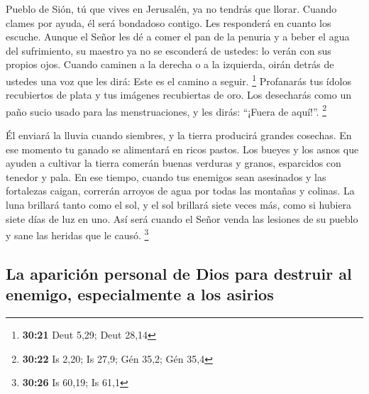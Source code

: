  Pueblo de Sión, tú que vives en Jerusalén, ya no tendrás
que llorar. Cuando clames por ayuda, él será bondadoso contigo. Les
responderá en cuanto los escuche.  Aunque el Señor les dé
a comer el pan de la penuria y a beber el agua del sufrimiento, su
maestro ya no se esconderá de ustedes: lo verán con sus propios ojos.
 Cuando caminen a la derecha o a la izquierda, oirán
detrás de ustedes una voz que les dirá: Este es el camino a seguir.
\footnote{\textbf{30:21} Deut 5,29; Deut 28,14} 
Profanarás tus ídolos recubiertos de plata y tus imágenes recubiertas de
oro. Los desecharás como un paño sucio usado para las menstruaciones, y
les dirás: ``¡Fuera de aquí!''. \footnote{\textbf{30:22} Is 2,20; Is
  27,9; Gén 35,2; Gén 35,4}

 Él enviará la lluvia cuando siembres, y la tierra
producirá grandes cosechas. En ese momento tu ganado se alimentará en
ricos pastos.  Los bueyes y los asnos que ayuden a
cultivar la tierra comerán buenas verduras y granos, esparcidos con
tenedor y pala.  En ese tiempo, cuando tus enemigos sean
asesinados y las fortalezas caigan, correrán arroyos de agua por todas
las montañas y colinas.  La luna brillará tanto como el
sol, y el sol brillará siete veces más, como si hubiera siete días de
luz en uno. Así será cuando el Señor venda las lesiones de su pueblo y
sane las heridas que le causó. \footnote{\textbf{30:26} Is 60,19; Is
  61,1}

\hypertarget{la-apariciuxf3n-personal-de-dios-para-destruir-al-enemigo-especialmente-a-los-asirios}{%
\subsection{La aparición personal de Dios para destruir al enemigo,
especialmente a los
asirios}\label{la-apariciuxf3n-personal-de-dios-para-destruir-al-enemigo-especialmente-a-los-asirios}}

